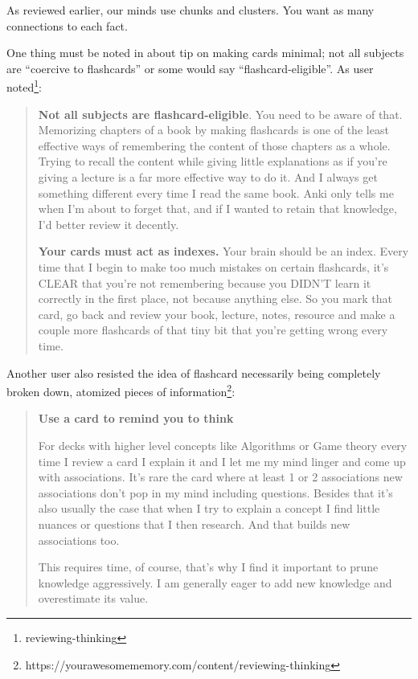 As reviewed earlier, our minds use chunks and clusters. You want as many
connections to each fact.

One thing must be noted in about tip on making cards minimal; not all
subjects are ``coercive to flashcards'' or some would say
``flashcard-eligible''. As user noted\footnote{reviewing-thinking}:

\begin{quote}
\textbf{Not all subjects are flashcard-eligible}. You need to be aware
of that. Memorizing chapters of a book by making flashcards is one of
the least effective ways of remembering the content of those chapters as
a whole. Trying to recall the content while giving little explanations
as if you're giving a lecture is a far more effective way to do it. And
I always get something different every time I read the same book. Anki
only tells me when I'm about to forget that, and if I wanted to retain
that knowledge, I'd better review it decently.

\textbf{Your cards must act as indexes.} Your brain should be an index.
Every time that I begin to make too much mistakes on certain flashcards,
it's CLEAR that you're not remembering because you DIDN'T learn it
correctly in the first place, not because anything else. So you mark
that card, go back and review your book, lecture, notes, resource and
make a couple more flashcards of that tiny bit that you're getting wrong
every time.
\end{quote}

Another user also resisted the idea of flashcard necessarily being
completely broken down, atomized pieces of information\footnote{https://yourawesomememory.com/content/reviewing-thinking}:

\begin{quote}
\textbf{Use a card to remind you to think}

For decks with higher level concepts like Algorithms or Game theory
every time I review a card I explain it and I let me my mind linger and
come up with associations. It's rare the card where at least 1 or 2
associations new associations don't pop in my mind including questions.
Besides that it's also usually the case that when I try to explain a
concept I find little nuances or questions that I then research. And
that builds new associations too.

This requires time, of course, that's why I find it important to prune
knowledge aggressively. I am generally eager to add new knowledge and
overestimate its value.
\end{quote}

